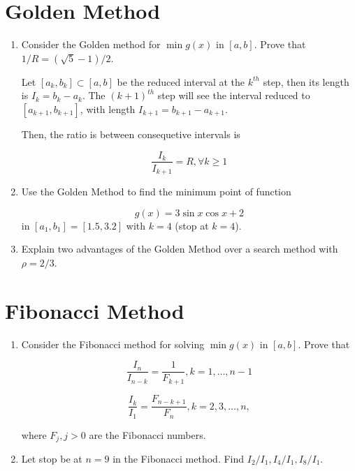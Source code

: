 \documentclass[11pt,oneside]{extarticle}
\begin{document}
\section{Golden Method}

\begin{enumerate}
    
    \item Consider the Golden method for $\min g(x)$ in $[a,b]$. Prove that
        $1/R = (\sqrt{5} - 1) / 2$.

        Let $[a_k,b_k] \subset [a,b]$ be the reduced interval at the $k^{th}$ step,
        then its length is $I_k = b_k - a_k$. The $(k+1)^{th}$ step will see the
        interval reduced to $[a_{k+1},b_{k+1}]$, with length $I_{k+1}=b_{k+1}-a_{k+1}$.

        Then, the ratio is between consequetive intervals is

        $$
        \frac{I_k}{I_{k+1}} = R, \forall k \geq 1
        $$


    \item Use the Golden Method to find the minimum point of function

        $$g(x) = 3\sin x\cos x + 2$$
        in $[a_1,b_1]=[1.5,3.2]$ with $k=4$ (stop at $k=4$).


    \item Explain two advantages of the Golden Method over a search method
        with $\rho=2/3$.

\end{enumerate}

\section{Fibonacci Method}

\begin{enumerate}

    \item Consider the Fibonacci method for solving $\min g(x)$ in $[a,b]$.
        Prove that

        $$\frac{I_n}{I_{n-k}}=\frac{1}{F_{k+1}}, k=1,\ldots,n-1$$

        $$\frac{I_k}{I_1}=\frac{F_{n-k+1}}{F_n}, k=2,3,\ldots,n,$$

        where $F_j,j>0$ are the Fibonacci numbers.

    \item Let stop be at $n=9$ in the Fibonacci method. Find $I_2/I_1,I_4/I_1,
        I_8/I_1$.

\end{enumerate}
\end{document}
